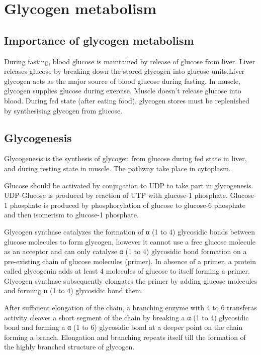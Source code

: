 \documentclass[
]{book}
\begin{document}
\chapter{Glycogen metabolism}\label{glycogen-metabolism}

\section{Importance of glycogen metabolism}\label{importance-of-glycogen-metabolism}

During fasting, blood glucose is maintained by release of glucose from liver. Liver releases glucose by breaking down the stored glycogen into glucose units.Liver glycogen acts as the major source of blood glucose during fasting. In muscle, glycogen supplies glucose during exercise. Muscle doesn't release glucose into blood. During fed state (after eating food), glycogen stores must be replenished by synthesising glycogen from glucose.

\section{Glycogenesis}\label{glycogenesis}

Glycogenesis is the synthesis of glycogen from glucose during fed state in liver, and during resting state in muscle. The pathway take place in cytoplasm.

Glucose should be activated by conjugation to UDP to take part in glycogenesis. UDP-Glucose is produced by reaction of UTP with glucose-1 phosphate. Glucose-1 phosphate is produced by phosphorylation of glucose to glucose-6 phosphate and then isomerism to glucose-1 phosphate.

Glycogen synthase catalyzes the formation of α (1 to 4) glycosidic bonds between glucose molecules to form glycogen, however it cannot use a free glucose molecule as an acceptor and can only catalyse α (1 to 4) glycosidic bond formation on a pre-existing chain of glucose molecules (primer). In absence of a primer, a protein called glycogenin adds at least 4 molecules of glucose to itself forming a primer. Glycogen synthase subsequently elongates the primer by adding glucose molecules and forming α (1 to 4) glycosidic bond them.

After sufficient elongation of the chain, a branching enzyme with 4 to 6 transferas activity cleaves a short segment of the chain by breaking a α (1 to 4) glycosidic bond and forming a α (1 to 6) glycosidic bond at a deeper point on the chain forming a branch. Elongation and branching repeats itself till the formation of the highly branched structure of glycogen.
\end{document}
